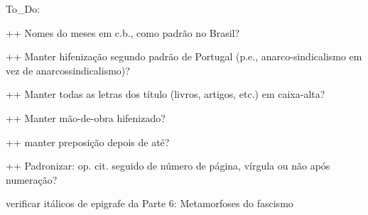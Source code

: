 To_Do:

++ Nomes do meses em c.b., como padrão no Brasil?

++ Manter hifenização segundo padrão de Portugal (p.e., anarco-sindicalismo em vez de anarcossindicalismo)?

++ Manter todas as letras dos título (livros, artigos, etc.) em caixa-alta?

++ Manter mão-de-obra hifenizado?

++ manter preposição depois de até?

++ Padronizar: op. cit. seguido de número de página, vírgula ou não após numeração?



verificar itálicos de epigrafe da Parte 6: Metamorfoses do fascismo